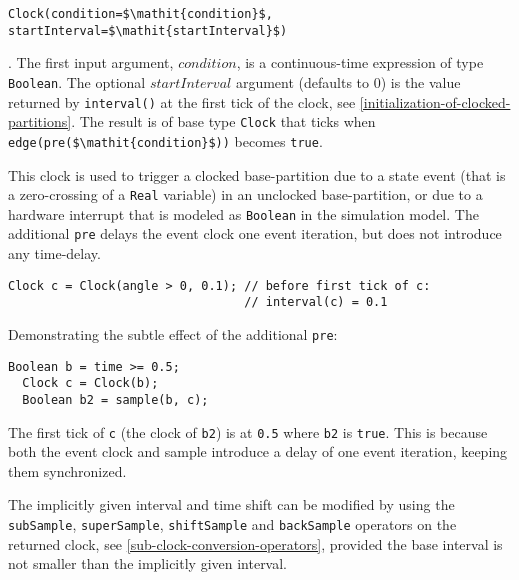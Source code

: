 \begin{operatordefinition*}[Clock]\label{modelica:clock-event}
\begin{synopsis}\begin{lstlisting}
Clock(condition=$\mathit{condition}$, startInterval=$\mathit{startInterval}$)
\end{lstlisting}\end{synopsis}
\begin{semantics}
.
The first input argument, $\mathit{condition}$, is a continuous-time expression of type \lstinline!Boolean!.
The optional $\mathit{startInterval}$ argument (defaults to 0) is the value returned by \lstinline!interval()! at the first tick of the clock, see \cref{initialization-of-clocked-partitions}.
The result is of base type \lstinline!Clock! that ticks when \lstinline!edge(pre($\mathit{condition}$))! becomes \lstinline!true!.
\begin{nonnormative}
This clock is used to trigger a clocked base-partition due to a state event (that is a zero-crossing of a \lstinline!Real! variable) in an unclocked base-partition, or due to a hardware interrupt that is modeled as \lstinline!Boolean! in the simulation model.
The additional \lstinline!pre! delays the event clock one event iteration, but does not introduce any time-delay.
\end{nonnormative}

\begin{example}
\begin{lstlisting}[language=modelica]
Clock c = Clock(angle > 0, 0.1); // before first tick of c:
                                 // interval(c) = 0.1
\end{lstlisting}
\end{example}

\begin{example}
Demonstrating the subtle effect of the additional \lstinline!pre!:
\begin{lstlisting}[language=modelica]
  Boolean b = time >= 0.5;
  Clock c = Clock(b);
  Boolean b2 = sample(b, c);
\end{lstlisting}
The first tick of \lstinline!c! (the clock of \lstinline!b2!) is at \lstinline!0.5! where \lstinline!b2! is \lstinline!true!.
This is because both the event clock and sample introduce a delay of one event iteration, keeping them synchronized.
\end{example}


\begin{nonnormative}
The implicitly given interval and time shift can be modified by using the \lstinline!subSample!, \lstinline!superSample!, \lstinline!shiftSample! and \lstinline!backSample! operators on the returned clock, see \cref{sub-clock-conversion-operators}, provided the base interval is not smaller than the implicitly given interval.
\end{nonnormative}
\end{semantics}
\end{operatordefinition*}

